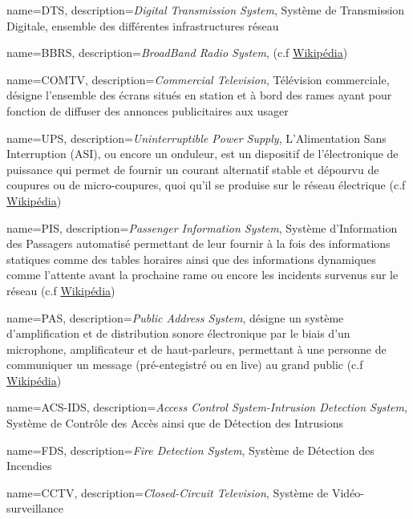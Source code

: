 {
	name=DTS,
	description={\textit{Digital Transmission System}, Système de Transmission Digitale, ensemble des différentes infrastructures réseau}
}

{
	name=BBRS,
	description={\textit{BroadBand Radio System},  (c.f \href{https://fr.wikipedia.org/wiki/Porte_palière_(métro)}{Wikipédia})}
}

{
	name=COMTV,
	description={\textit{Commercial Television}, Télévision commerciale, désigne l'ensemble des écrans situés en station et à bord des rames ayant pour fonction de diffuser des annonces publicitaires aux usager}
}

{
	name=UPS,
	description={\textit{Uninterruptible Power Supply}, L'Alimentation Sans Interruption (ASI), ou encore un onduleur, est un dispositif de l'électronique de puissance qui permet de fournir un courant alternatif stable et dépourvu de coupures ou de micro-coupures, quoi qu'il se produise sur le réseau électrique (c.f \href{https://fr.wikipedia.org/wiki/Alimentation_sans_interruption}{Wikipédia})}
}


{
	name=PIS,
	description={\textit{Passenger Information System}, Système d'Information des Passagers automatisé permettant de leur fournir à la fois des informations statiques comme des tables horaires ainsi que des informations dynamiques comme l'attente avant la prochaine rame ou encore les incidents survenus sur le réseau (c.f \href{https://en.wikipedia.org/wiki/Passenger_information_system}{Wikipédia})}
}

{
	name=PAS,
	description={\textit{Public Address System}, désigne un système d'amplification et de distribution sonore électronique par le biais d'un microphone, amplificateur et de haut-parleurs, permettant à une personne de communiquer un message (pré-entegistré ou en live) au grand public (c.f \href{https://en.wikipedia.org/wiki/Public_address_system}{Wikipédia})}
}

{
	name=ACS-IDS,
	description={\textit{Access Control System-Intrusion Detection System}, Système de Contrôle des Accès ainsi que de Détection des Intrusions}
}

{
	name=FDS,
	description={\textit{Fire Detection System}, Système de Détection des Incendies}
}

{
	name=CCTV,
	description={\textit{Closed-Circuit Television}, Système de Vidéo-surveillance}
}

